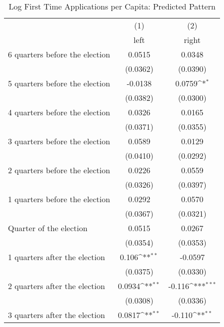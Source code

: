 \begin{table}[htbp]\centering
\def\sym#1{\ifmmode^{#1}\else\(^{#1}\)\fi}
\caption{Log First Time Applications per Capita: Predicted Pattern}
\begin{tabular}{l*{2}{c}}
\hline\hline
                    &\multicolumn{1}{c}{(1)}&\multicolumn{1}{c}{(2)}\\
                    &\multicolumn{1}{c}{left}&\multicolumn{1}{c}{right}\\
\hline
 6 quarters before the election&      0.0515         &      0.0348         \\
                    &    (0.0362)         &    (0.0390)         \\
[1em]
 5 quarters before the election&     -0.0138         &      0.0759\sym{*}  \\
                    &    (0.0382)         &    (0.0300)         \\
[1em]
 4 quarters before the election&      0.0326         &      0.0165         \\
                    &    (0.0371)         &    (0.0355)         \\
[1em]
 3 quarters before the election&      0.0589         &      0.0129         \\
                    &    (0.0410)         &    (0.0292)         \\
[1em]
 2 quarters before the election&      0.0226         &      0.0559         \\
                    &    (0.0326)         &    (0.0397)         \\
[1em]
 1 quarters before the election&      0.0292         &      0.0570         \\
                    &    (0.0367)         &    (0.0321)         \\
[1em]
Quarter of the election&      0.0515         &      0.0267         \\
                    &    (0.0354)         &    (0.0353)         \\
[1em]
 1 quarters after the election&       0.106\sym{**} &     -0.0597         \\
                    &    (0.0375)         &    (0.0330)         \\
[1em]
 2 quarters after the election&      0.0934\sym{**} &      -0.116\sym{***}\\
                    &    (0.0308)         &    (0.0336)         \\
[1em]
 3 quarters after the election&      0.0817\sym{**} &      -0.110\sym{**} \\

\end{tabular}
\end{table}
